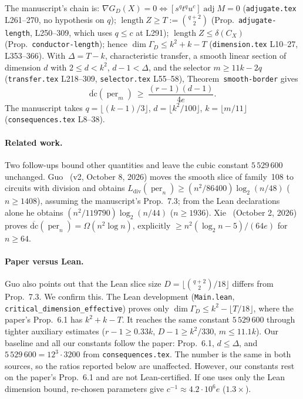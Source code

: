 \documentclass[11pt]{amsart}
\theoremstyle{remark}
\DeclareMathOperator{\adj}{adj}
\DeclareMathOperator{\per}{per}
\DeclareMathOperator{\len}{length}
\newcommand{\bdc}{\overline{\mathrm{dc}}}
\begin{document}
The manuscript's chain is: $\nabla G_D(X)=0\iff[s^qt^qu^c]\adj M=0$
(\texttt{adjugate.tex} L261--270, no hypothesis on $q$);
$\len Z\ge T:=\binom{q+2}2$ (Prop.~\texttt{adjugate-length}, L250--309, which
uses $q\le c$ at L291); $\len Z\le\delta(C_X)$
(Prop.~\texttt{conductor-length}); hence
$\dim\Gamma_D\le k^2+k-T$ (\texttt{dimension.tex} L10--27, L353--366).
With $\Delta=T-k$, characteristic transfer, a smooth linear section of
dimension $d$ with $2\le d<k^2$, $d-1<\Delta$, and the selector
$m\ge11k-2q$ (\texttt{transfer.tex} L218--309, \texttt{selector.tex} L55--58),
Theorem~\texttt{smooth-border} gives
\begin{equation}\label{eq:chain}
\bdc(\per_m)\ \ge\ \frac{(r-1)(d-1)}{4e}.
\end{equation}
The manuscript takes $q=\lfloor(k-1)/3\rfloor$, $d=\lfloor k^2/100\rfloor$,
$k=\lfloor m/11\rfloor$ (\texttt{consequences.tex} L8--38).

\sloppy
\paragraph{Related work.} Two follow-ups bound other quantities and leave the
cubic constant $5\,529\,600$ unchanged. Guo~\cite{Guo} (v2, October 8, 2026)
moves the smooth slice of family~108 to circuits with division and obtains
$L_{\mathrm{div}}(\per_n)\ge(n^2/86400)\log_2(n/48)$ ($n\ge1408$), assuming the
manuscript's Prop.~7.3; from the Lean declarations alone he obtains
$(n^2/119790)\log_2(n/44)$ ($n\ge1936$). Xie~\cite{Xie} (October 2, 2026)
proves $\bdc(\per_n)=\Omega(n^2\log n)$, explicitly
$\ge n^2(\log_2n-5)/(64e)$ for $n\ge64$.

\paragraph{Paper versus Lean.} Guo also points out that the Lean slice size
$D=\lfloor\binom{q+2}2/18\rfloor$ differs from Prop.~7.3. We confirm this. The
Lean development (\texttt{Main.lean}, \texttt{critical\_dimension\_effective})
proves only $\dim\Gamma_D\le k^2-\lfloor T/18\rfloor$, where the paper's
Prop.~6.1 has $k^2+k-T$. It reaches the same constant $5\,529\,600$ through
tighter auxiliary estimates ($r-1\ge0.33k$, $D-1\ge k^2/330$, $m\le11.1k$).
Our baseline and all our constants follow the paper: Prop.~6.1, $d\le\Delta$,
and $5\,529\,600=12^3\cdot3200$ from \texttt{consequences.tex}. The number is
the same in both sources, so the ratios reported below are unaffected. However,
our constants rest on the paper's Prop.~6.1 and are not Lean-certified. If one
uses only the Lean dimension bound, re-chosen parameters give
$c^{-1}\approx4.2\cdot10^6e$ ($1.3\times$).
\end{document}
